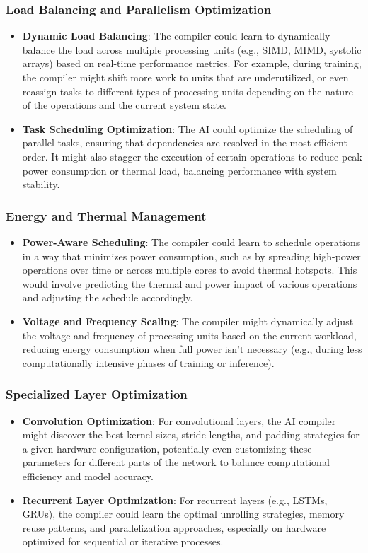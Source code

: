 \documentclass{article}
\begin{document}
\subsubsection{Load Balancing and Parallelism Optimization}
\begin{itemize}
    \item \textbf{Dynamic Load Balancing}: The compiler could learn to dynamically balance the load across multiple processing units (e.g., SIMD, MIMD, systolic arrays) based on real-time performance metrics. For example, during training, the compiler might shift more work to units that are underutilized, or even reassign tasks to different types of processing units depending on the nature of the operations and the current system state.
    \item \textbf{Task Scheduling Optimization}: The AI could optimize the scheduling of parallel tasks, ensuring that dependencies are resolved in the most efficient order. It might also stagger the execution of certain operations to reduce peak power consumption or thermal load, balancing performance with system stability.
\end{itemize}

\subsubsection{Energy and Thermal Management}
\begin{itemize}
    \item \textbf{Power-Aware Scheduling}: The compiler could learn to schedule operations in a way that minimizes power consumption, such as by spreading high-power operations over time or across multiple cores to avoid thermal hotspots. This would involve predicting the thermal and power impact of various operations and adjusting the schedule accordingly.
    \item \textbf{Voltage and Frequency Scaling}: The compiler might dynamically adjust the voltage and frequency of processing units based on the current workload, reducing energy consumption when full power isn’t necessary (e.g., during less computationally intensive phases of training or inference).
\end{itemize}

\subsubsection{Specialized Layer Optimization}
\begin{itemize}
    \item \textbf{Convolution Optimization}: For convolutional layers, the AI compiler might discover the best kernel sizes, stride lengths, and padding strategies for a given hardware configuration, potentially even customizing these parameters for different parts of the network to balance computational efficiency and model accuracy.
    \item \textbf{Recurrent Layer Optimization}: For recurrent layers (e.g., LSTMs, GRUs), the compiler could learn the optimal unrolling strategies, memory reuse patterns, and parallelization approaches, especially on hardware optimized for sequential or iterative processes.
\end{itemize}
\end{document}
